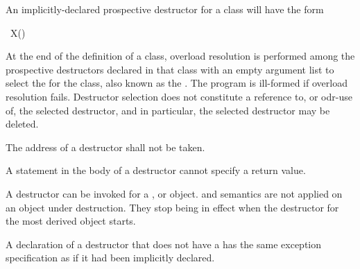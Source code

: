 \pnum
An implicitly-declared prospective destructor for a class  will have the form
\begin{codeblock}
~X()
\end{codeblock}

\pnum
At the end of the definition of a class,
overload resolution is performed
among the prospective destructors declared in that class
with an empty argument list
to select the  for the class,
also known as the .
The program is ill-formed if overload resolution fails.
Destructor selection does not constitute
a reference to,
or odr-use of,
the selected destructor,
and in particular,
the selected destructor may be deleted.

\pnum
{}%
The address of a destructor shall not be taken.
%
\begin{note}
A  statement in the body of a destructor
cannot specify a return value.
\end{note}
%
%
A destructor can be invoked for a
,
or
object.
and
semantics are not applied on an object under destruction.
They stop being in effect when the destructor for the
most derived object starts.

\pnum
\begin{note}
A declaration of a destructor that does not have a 
has the same exception specification as if it had been implicitly declared.
\end{note}

